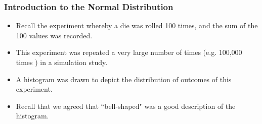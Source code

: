 
\begin{frame}

\frametitle{Introduction to the Normal Distribution}
\begin{itemize}
\item
Recall the experiment whereby a die was rolled 100 times, and the sum of the 100 values was recorded.
\item
This experiment was repeated a very large number of times (e.g. 100,000 times ) in a simulation study.
\item
A histogram was drawn to depict the distribution of outcomes of this experiment.
\item Recall that we agreed that ``bell-shaped" was a good description of the histogram.

\end{itemize}
\end{frame}



